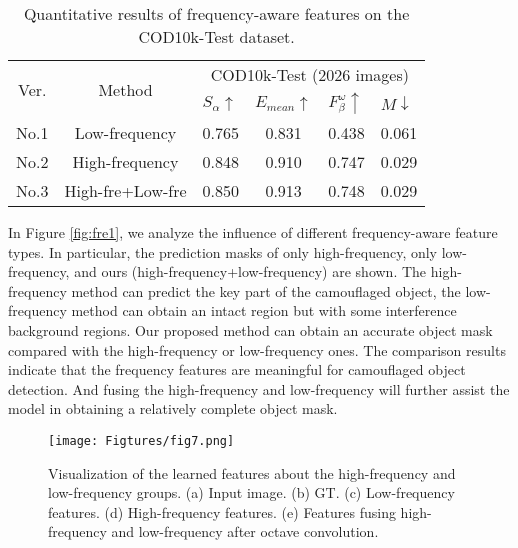 \documentclass[sigconf,screen]{acmart}
\begin{document}
\begin{table}[!t]
\caption{Quantitative results of frequency-aware features on the COD10k-Test dataset.}
\begin{tabular}{cc|cccc}
\hline
\multirow{2}{*}{Ver.} & \multirow{2}{*}{Method} & \multicolumn{4}{c}{COD10k-Test (2026 images)}                                                          \\ \cline{3-6} 
                      &                         & \multicolumn{1}{l}{\(S_\alpha\uparrow\) } & \multicolumn{1}{l}{\(E_{mean} \uparrow\)} & \multicolumn{1}{l}{\(F_\beta^\omega \uparrow\)} & \multicolumn{1}{l}{\(M\downarrow\) } \\ \hline
No.1                  & Low-frequency           & 0.765                 & 0.831                 & 0.438                 & 0.061                 \\
No.2                  & High-frequency          & 0.848                 & 0.910                 & 0.747                 & 0.029                 \\
No.3                  & High-fre+Low-fre          & 0.850                 & 0.913                 & 0.748                 & 0.029                 \\ \hline
\end{tabular}
\label{frequency}
\end{table}



In Figure \ref{fig:fre1}, we analyze the influence of different frequency-aware feature types. In particular, the prediction masks of only high-frequency, only low-frequency, and ours (high-frequency+low-frequency) are shown. The high-frequency method can predict the key part of the camouflaged object, the low-frequency method can obtain an intact region but with some interference background regions. 
Our proposed method can obtain an accurate object mask compared with the high-frequency or low-frequency ones. The comparison results indicate that the frequency features are meaningful for camouflaged object detection. And fusing the high-frequency and low-frequency will further assist the model in obtaining a relatively complete object mask. 

\begin{figure}[!t]
\centering
\texttt{[image: Figtures/fig7.png]}
\caption{Visualization of the learned features about the high-frequency and low-frequency groups. (a) Input image. (b) GT. (c) Low-frequency features. (d) High-frequency features. (e) Features fusing high-frequency and low-frequency after octave convolution.}
\label{fig:fre2}
\end{figure}
\end{document}
